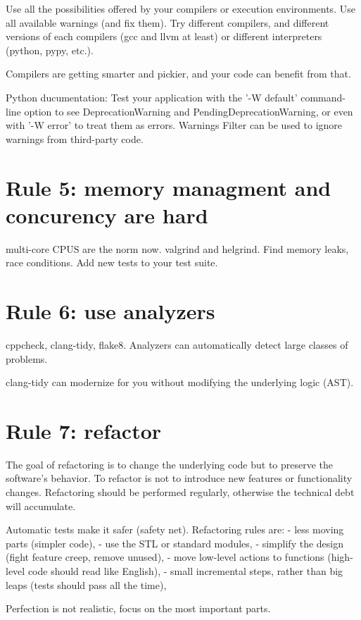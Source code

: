 \documentclass[10pt,letterpaper]{article}
\begin{document}
Use all the possibilities offered by your compilers or execution
environments. Use all available warnings (and fix them). Try different
compilers, and different versions of each compilers (gcc and llvm at
least) or different interpreters (python, pypy, etc.).

Compilers are getting smarter and pickier, and your code can benefit
from that.

Python ducumentation: Test your application with the '-W default'
command-line option to see DeprecationWarning and
PendingDeprecationWarning, or even with '-W error' to treat them as
errors. Warnings Filter can be used to ignore warnings from
third-party code.

\section*{Rule 5: memory managment and concurency are hard}

multi-core CPUS are the norm now. valgrind and helgrind. Find memory
leaks, race conditions. Add new tests to your test suite.

\section*{Rule 6: use analyzers}

cppcheck, clang-tidy, flake8. Analyzers can automatically detect large
classes of problems.

clang-tidy can modernize for you without modifying the underlying
logic (AST).

\section*{Rule 7: refactor}

The goal of refactoring is to change the underlying code but to
preserve the software's behavior. To refactor is not to introduce new
features or functionality changes. Refactoring should be performed
regularly, otherwise the technical debt will accumulate.

Automatic tests make it safer (safety net). Refactoring rules are:
- less moving parts (simpler code),
- use the STL or standard modules,
- simplify the design (fight feature creep, remove unused),
- move low-level actions to functions (high-level code should read
  like English),
- small incremental steps, rather than big leaps (tests should pass
  all the time),

Perfection is not realistic, focus on the most important parts.
\end{document}
